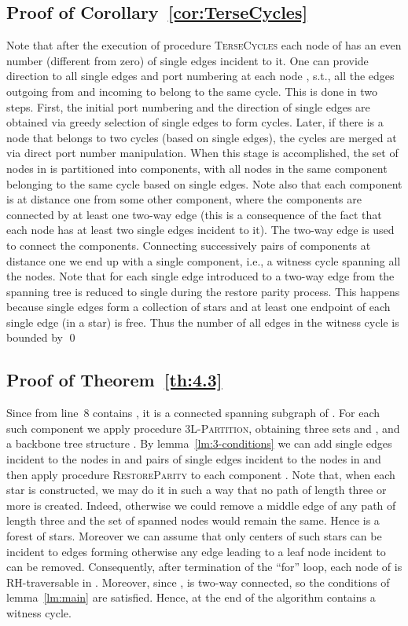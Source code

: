 \documentclass[11pt,envcountsame,oribibl]{llncs}
\begin{document}
\subsection{Proof of Corollary~\ref{cor:TerseCycles}}
Note that after the execution of procedure \textsc{TerseCycles}   each node
of  has an even number (different from zero)
of single edges incident to it. One can provide direction to all single
edges and port numbering at each node , s.t., all the edges
outgoing from and incoming to  belong to the same cycle. This is
done in two steps. First, the initial port numbering and
the direction of single edges are obtained via greedy selection of single
edges to form cycles. Later, if there is a node  that belongs to two cycles
(based on single edges), the cycles are merged at  via direct port number
manipulation. When this stage is accomplished, the set of nodes in 
is partitioned into components, with all nodes in the same component belonging
to the same cycle based on single edges.
Note also that each component is at distance one from some other component,
where the components are connected by at least one two-way edge (this is a
consequence of the fact that each node has at least two single edges
incident to it). The two-way edge is used to connect the components.
Connecting successively pairs of components at distance one we end up
with a single component, i.e., a witness cycle spanning all the nodes.
Note that for each single edge introduced to  a two-way edge
from the spanning tree is reduced to single during the restore parity process.
This happens because single edges form a collection of stars and
at least one endpoint of each single edge (in a star) is free.
Thus the number of all edges in the witness cycle is bounded by 
\hfill\qed


\subsection{Proof of Theorem~\ref{th:4.3}}
Since  from line~8 contains , it is a connected
spanning subgraph of .
For each such component we apply procedure \textsc{3L-Partition},
obtaining three sets  and , and a backbone tree
structure . By lemma~\ref{lm:3-conditions} we can add single edges
incident to the nodes in  and pairs of single edges incident
to the nodes in  and then apply procedure \textsc{RestoreParity}
to each component . Note that,
when each star  is constructed, we may do it in such a way that no
path of length three or more is created. Indeed, otherwise we could remove
a middle edge of any path of length three and the set of spanned
nodes would remain the same. Hence  is a forest of stars. Moreover we
can assume that only centers of such stars can be incident to edges forming 
otherwise any edge leading to a leaf node incident to  can be removed.
Consequently, after termination of the ``for'' loop, each
node of  is RH-traversable in . Moreover,
since ,  is two-way
connected, so the conditions of lemma~\ref{lm:main} are satisfied.
Hence, at the end of the algorithm  contains a witness cycle.
\noindent
\end{document}
